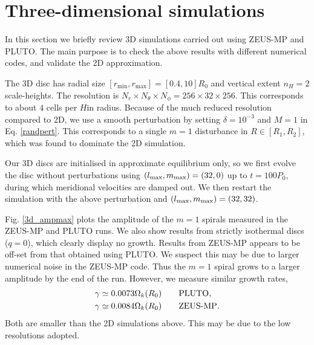 \section{Three-dimensional simulations}\label{results3d}
In this section we briefly review 3D simulations carried 
out using ZEUS-MP and PLUTO. The main purpose is to check 
the above results with different numerical codes, and validate  
the 2D approximation.    

The 3D disc has radial size
$[r_\mathrm{min},r_\mathrm{max}]=[0.4,10]R_0$ and vertical extent 
$n_H=2$ scale-heights. The resolution is $N_r\times N_\theta\times
N_\phi=256\times32\times256$. This corresponds to about $4$ cells per
$H$in radius. 
Because of the much reduced resolution 
compared to 2D, we use a smooth perturbation by setting
$\delta = 10^{-3}$ and $M=1$ in Eq. \ref{randpert}. This corresponds
to a single $m=1$ disturbance in $R\in[R_1,R_2]$, which was found to dominate
the 2D simulation.  

Our 3D discs are initialised in approximate equilibrium only, so we
first evolve the disc without perturbations using  
$(l_\mathrm{max},m_\mathrm{max})=(32,0)$ up to $t=100P_0$, during which 
meridional velocities are damped out. We then restart the simulation
with the above perturbation and $(l_\mathrm{max},m_\mathrm{max})=(32,32)$. 


Fig. \ref{3d_ampmax} plots the amplitude of the $m=1$ spirals measured
in the ZEUS-MP and PLUTO runs. We also show results from strictly
isothermal discs ($q=0$), which clearly display no growth. %
Results from ZEUS-MP appears to be off-set from that obtained using
PLUTO. We suspect this may be due to larger numerical noise in the
ZEUS-MP code. Thus the $m=1$ spiral grows to a larger amplitude by the
end of the run. However, we measure similar growth rates,
\begin{align*}
&\gamma \simeq 0.0073\Omega_k(R_0) \quad\quad \mathrm{PLUTO},\\
&\gamma \simeq 0.0084\Omega_k(R_0) \quad\quad {\operatorname{ZEUS-MP}}.
\end{align*}
Both are smaller than the 2D simulations above. This may be due to the
low resolutions adopted. 

